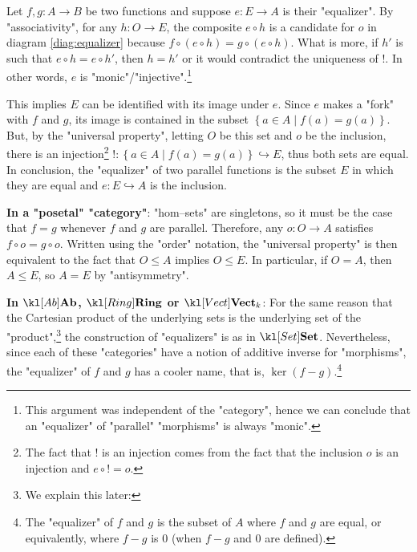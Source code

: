 \documentclass[main.tex]{subfiles}
\begin{document}
\begin{exmp}[$\catSet$]
    Let $f,g:A\rightarrow B$ be two functions and suppose $e:E\rightarrow A$ is their "equalizer". By "associativity", for any $h:O\rightarrow E$, the composite $e\circ h$ is a candidate for $o$ in diagram \eqref{diag:equalizer} because $f\circ (e \circ h) = g \circ (e \circ h)$. What is more, if $h'$ is such that $e \circ h = e\circ h'$, then $h=h'$ or it would contradict the uniqueness of $!$. In other words, $e$ is "monic"/"injective".\footnote{This argument was independent of the "category", hence we can conclude that an "equalizer" of "parallel" "morphisms" is always "monic".}

    This implies $E$ can be identified with its image under $e$. Since $e$ makes a "fork" with $f$ and $g$, its image is contained in the subset $\left\{ a \in A \mid f(a) = g(a)\right\}$. But, by the "universal property", letting $O$ be this set and $o$ be the inclusion, there is an injection\footnote{The fact that $!$ is an injection comes from the fact that the inclusion $o$ is an injection and $e\circ {!} = o$.} $!: \left\{ a \in A \mid f(a) = g(a)\right\} \hookrightarrow E$, thus both sets are equal. In conclusion, the "equalizer" of two parallel functions is the subset $E$ in which they are equal and $e:E \hookrightarrow A$ is the inclusion.
\end{exmp}
\begin{exmps}
    \textbf{In a "posetal" "category"}: "hom--sets" are singletons, so it must be the case that $f = g$ whenever $f$ and $g$ are parallel. Therefore, any $o:O \rightarrow A$ satisfies $f\circ o = g\circ o$. Written using the "order" notation, the "universal property" is then equivalent to the fact that $O \leq A$ implies $O \leq E$. In particular, if $O= A$, then $A\leq E$, so $A = E$ by "antisymmetry".

    \textbf{In $\catAb$, $\catRing$ or $\catVect{k}$}: For the same reason that the Cartesian product of the underlying sets is the underlying set of the "product",\footnote{We explain this later:} the construction of "equalizers" is as in $\catSet$. Nevertheless, since each of these "categories" have a notion of additive inverse for "morphisms", the "equalizer" of $f$ and $g$ has a cooler name, that is, $\ker(f-g)$.\footnote{The "equalizer" of $f$ and $g$ is the subset of $A$ where $f$ and $g$ are equal, or equivalently, where $f-g$ is $0$ (when $f-g$ and $0$ are defined).}%

\end{exmps}
\end{document}
